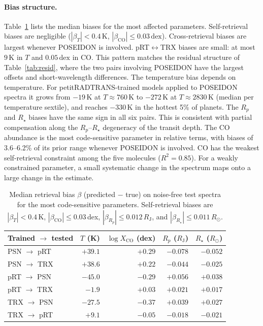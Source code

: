 \paragraph{Bias structure.}
Table~\ref{tab:bias} lists the median biases for the most affected parameters.
Self-retrieval biases are negligible ($|\beta_T|<0.4\,\mathrm{K}$, $|\beta_{\mathrm{CO}}|\leq0.03\,\mathrm{dex}$).
Cross-retrieval biases are largest whenever POSEIDON is involved.
pRT$\leftrightarrow$TRX biases are small: at most $9\,\mathrm{K}$ in $T$ and $0.05\,\mathrm{dex}$ in CO.
This pattern matches the residual structure of Table~\ref{tab:resid}, where the two pairs involving POSEIDON have the largest offsets and short-wavelength differences.
The temperature bias depends on temperature.
For petitRADTRANS-trained models applied to POSEIDON spectra it grows from $-19\,\mathrm{K}$ at $T\approx760\,\mathrm{K}$ to $-272\,\mathrm{K}$ at $T\approx2830\,\mathrm{K}$ (median per temperature sextile), and reaches $-330\,\mathrm{K}$ in the hottest 5\% of planets.
The $R_p$ and $R_\star$ biases have the same sign in all six pairs.
This is consistent with partial compensation along the $R_p$--$R_\star$ degeneracy of the transit depth.
The CO abundance is the most code-sensitive parameter in relative terms, with biases of 3.6--6.2\% of its prior range whenever POSEIDON is involved.
CO has the weakest self-retrieval constraint among the five molecules ($R^2=0.85$).
For a weakly constrained parameter, a small systematic change in the spectrum maps onto a large change in the estimate.

\begin{table}[t]
  \centering
  \caption{Median retrieval bias $\beta$ (predicted $-$ true) on noise-free test spectra for the most code-sensitive parameters. Self-retrieval biases are $|\beta_T|<0.4$\,K, $|\beta_{\mathrm{CO}}|\leq0.03$\,dex, $|\beta_{R_p}|\leq0.012\,R_{\mathrm J}$, and $|\beta_{R_\star}|\leq0.011\,R_\odot$.}
  \label{tab:bias}
  \begin{tabular}{lrrrr}
    \toprule
    Trained $\rightarrow$ tested & $T$ (K) & $\log X_{\mathrm{CO}}$ (dex) & $R_p$ ($R_{\mathrm J}$) & $R_\star$ ($R_\odot$) \\
    \midrule
    PSN $\rightarrow$ pRT & $+39.1$ & $+0.29$ & $-0.078$ & $-0.052$ \\
    PSN $\rightarrow$ TRX & $+38.6$ & $+0.22$ & $-0.044$ & $-0.025$ \\
    pRT $\rightarrow$ PSN & $-45.0$ & $-0.29$ & $+0.056$ & $+0.038$ \\
    pRT $\rightarrow$ TRX & $-1.9$  & $+0.03$ & $+0.021$ & $+0.017$ \\
    TRX $\rightarrow$ PSN & $-27.5$ & $-0.37$ & $+0.039$ & $+0.027$ \\
    TRX $\rightarrow$ pRT & $+9.1$  & $-0.05$ & $-0.018$ & $-0.021$ \\
    \bottomrule
  \end{tabular}
\end{table}

